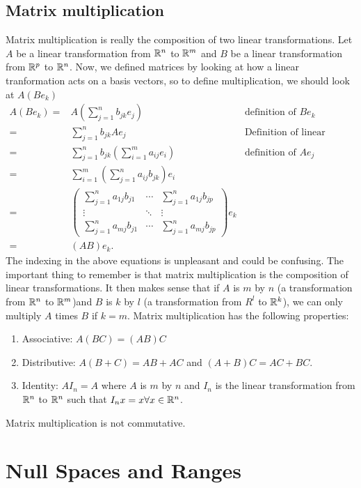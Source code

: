 \subsection{Matrix multiplication}
Matrix multiplication is really the composition of two linear
transformations. Let $A$ be a linear transformation from $\mathbb{R}^n$ to
$\mathbb{R}^m$ and $B$ be a linear transformation from $\mathbb{R}^p$ to $\mathbb{R}^n$. Now,
we defined matrices by looking at how a linear tranformation acts on a
basis vectors, so to define multiplication, we should look at $A(B
e_k)$
\begin{align*}
  A(B e_k) = & A (\sum_{j=1}^n b_{jk} e_j) & \text{definition of $Be_k$}\\
  = & \sum_{j=1}^n b_{jk} A e_j & \text{Definition of linear
    transformtion} \\
  = & \sum_{j=1}^n b_{jk} \left(\sum_{i=1}^m a_{ij} e_i\right)  &
  \text{definition of $Ae_j$} \\
  = & \sum_{i=1}^m \left(\sum_{j=1}^n a_{ij} b_{jk} \right) e_i \\
  = & \begin{pmatrix} 
    \sum_{j=1}^n a_{1j} b_{j1} & \cdots & \sum_{j=1}^n a_{1j} b_{jp} \\
    \vdots & \ddots & \vdots \\
    \sum_{j=1}^n a_{mj} b_{j1} & \cdots & \sum_{j=1}^n a_{mj} b_{jp}
  \end{pmatrix} e_k  \\
  = & (AB)e_k .
\end{align*}
The indexing in the above equations is unpleasant and could be
confusing. The important thing to remember is that matrix
multiplication is the composition of linear transformations. It then
makes sense that if $A$ is $m$ by $n$ (a transformation from $\mathbb{R}^n$ to
$\mathbb{R}^m$)and $B$ is $k$ by $l$ (a transformation from $R^l$ to $\mathbb{R}^k$),
we can only multiply $A$ times $B$ if $k = m$. Matrix multiplication
has the following properties:
\begin{enumerate}
\item Associative: $A(BC) = (AB) C$
\item Distributive: $A(B+C) = AB + AC$ and $(A+B)C = AC + BC$. 
\item Identity: $AI_n = A$ where $A$ is $m$ by $n$ and $I_n$ is the linear
  transformation from $\mathbb{R}^n$ to $\mathbb{R}^n$ such that $I_nx = x \forall x \in
  \mathbb{R}^n$.
\end{enumerate}
Matrix multiplication is not commutative. 

\section{Null Spaces and Ranges}

